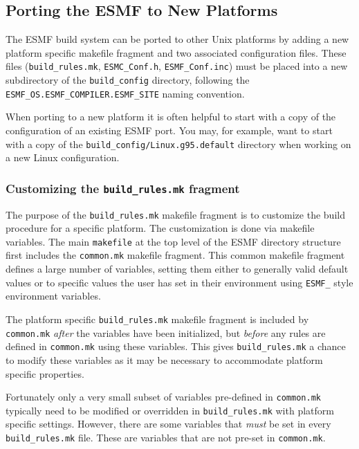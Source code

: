 \subsection{Porting the ESMF to New Platforms}

The ESMF build system can be ported to other Unix platforms by adding a new
platform specific makefile fragment and two associated configuration files.
These files ({\tt build\_rules.mk}, {\tt ESMC\_Conf.h}, {\tt ESMF\_Conf.inc})
must be placed into a new subdirectory of the {\tt build\_config} directory,
following the {\tt ESMF\_OS.ESMF\_COMPILER.ESMF\_SITE} naming convention.

When porting to a new platform it is often helpful to start with a copy 
of the configuration of an existing ESMF port. You may, for example, want to
start with a copy of the {\tt build\_config/Linux.g95.default} directory when
working on a new Linux configuration.

\subsubsection{Customizing the {\tt build\_rules.mk} fragment}

The purpose of the {\tt build\_rules.mk} makefile fragment is to customize the
build procedure for a specific platform. The customization is done via makefile
variables. The main {\tt makefile} at the top level of the ESMF directory
structure first includes the {\tt common.mk} makefile fragment. This common
makefile fragment defines a large number of variables, setting them either to
generally valid default values or to specific values the user has set in their
environment using {\tt ESMF\_} style environment variables.

The platform specific {\tt build\_rules.mk} makefile fragment is included by
{\tt common.mk} {\em after} the variables have been initialized, but 
{\em before} any rules are defined in {\tt common.mk} using these variables.
This gives {\tt build\_rules.mk} a chance to modify these variables as it may
be necessary to accommodate platform specific properties.

Fortunately only a very small subset of variables pre-defined in {\tt common.mk}
typically need to be modified or overridden in {\tt build\_rules.mk} with 
platform specific settings. However, there are some variables that {\em must}
be set in every {\tt build\_rules.mk} file. These are variables that are not
pre-set in {\tt common.mk}.

